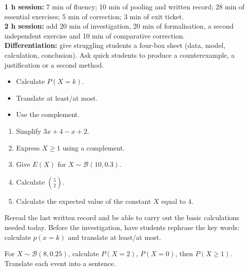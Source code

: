 \ifprof
\begin{methode}
\textbf{1 h session:} 7 min of fluency; 10 min of pooling and written record; 28 min of essential exercises; 5 min of correction; 3 min of exit ticket.\\
\textbf{2 h session:} add 20 min of investigation, 20 min of formalisation, a second independent exercise and 10 min of comparative correction.\\
\textbf{Differentiation:} give struggling students a four-box sheet (data, model, calculation, conclusion). Ask quick students to produce a counterexample, a justification or a second method.
\end{methode}
\fi
{}
\begin{objectifs}\begin{itemize}\item Calculate $P(X=k)$.\item Translate at least/at most.\item Use the complement.\end{itemize}\end{objectifs}
\begin{automatismes}\begin{enumerate}\item Simplify $3x+4-x+2$. \item Express $X\geq1$ using a complement. \item Give $E(X)$ for $X\sim\mathcal B(10,0.3)$. \item Calculate $\binom52$. \item Calculate the expected value of the constant $X$ equal to $4$. \end{enumerate}\end{automatismes}
\begin{prerequis}Reread the last written record and be able to carry out the basic calculations needed today. Before the investigation, have students rephrase the key words: calculate $p(x=k)$ and translate at least/at most.\end{prerequis}

\begin{activite}
For $X\sim\mathcal B(8,0.25)$, calculate $P(X=2)$, $P(X=0)$, then $P(X\geq1)$. Translate each event into a sentence.
\begin{center}\end{center}
\end{activite}

